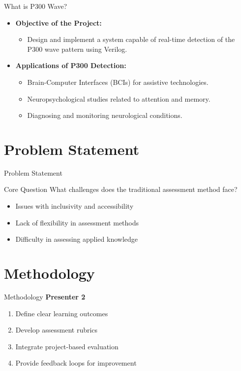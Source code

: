 \documentclass{beamer}
\begin{document}
\begin{frame}{What is P300 Wave?}
\begin{itemize}

\item \textbf{Objective of the Project:} 
\begin{itemize}
\item Design and implement a system capable of real-time detection of the P300 wave pattern using Verilog.
\end{itemize}
\item \textbf{Applications of P300 Detection:}
\begin{itemize}
\item Brain-Computer Interfaces (BCIs) for assistive technologies.
\item Neuropsychological studies related to attention and memory.
\item Diagnosing and monitoring neurological conditions.
\end{itemize}

\end{itemize}
\end{frame}

\section{Problem Statement}
\begin{frame}{Problem Statement}
    \begin{block}{Core Question}
        What challenges does the traditional assessment method face?
    \end{block}
    \begin{itemize}
        \item Issues with inclusivity and accessibility
        \item Lack of flexibility in assessment methods
        \item Difficulty in assessing applied knowledge
    \end{itemize}
\end{frame}

\section{Methodology}
\begin{frame}{Methodology}
    \textbf{Presenter 2}
    \begin{enumerate}
        \item Define clear learning outcomes
        \item Develop assessment rubrics
        \item Integrate project-based evaluation
        \item Provide feedback loops for improvement
    \end{enumerate}
\end{frame}
\end{document}
